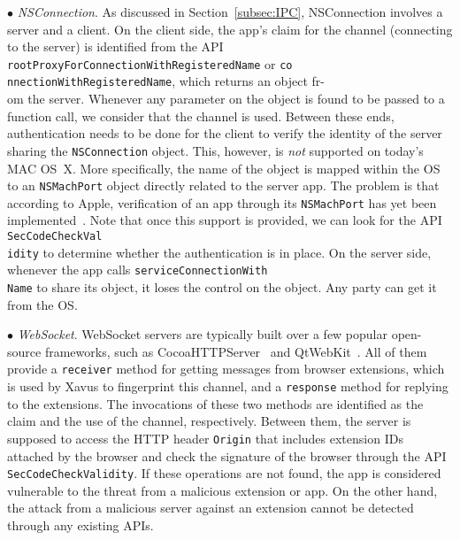 \documentclass{article}
\begin{document}
\vspace {3pt}\noindent$\bullet$\textit{ NSConnection}. As discussed in Section~\ref{subsec:IPC}, NSConnection involves a server and a client. On the client side, the app's claim for the channel (connecting to the server) is identified from the API \texttt{rootProxyForConnectionWithRegisteredName} or \texttt{co\\nnectionWithRegisteredName}, which returns an object fr-\\om the server. Whenever any parameter on the object is found to be passed to a function call, we consider that the channel is used.  Between these ends, authentication needs to be done for the client to verify the identity of the server sharing the \texttt{NSConnection} object.  This, however, is \textit{not} supported on today's MAC OS~X. More specifically, the name of the object is mapped within the OS to an \texttt{NSMachPort} object directly related to the server app.  The problem is that according to Apple, verification of an app through its \texttt{NSMachPort} has yet been implemented~\cite{machnotimp}. Note that once this support is provided, we can look for the API \texttt{SecCodeCheckVal\\idity} to determine whether the authentication is in place. On the server side, whenever the app calls \texttt{serviceConnectionWith\\Name} to share its object, it loses the control on the object. Any party can get it from the OS.



\vspace {3pt}\noindent$\bullet$\textit{ WebSocket}. WebSocket servers are typically built over a few popular open-source frameworks, such as CocoaHTTPServer~\cite{CocoaHTTPServer} and QtWebKit~\cite{QtWebKit}. All of them provide a \texttt{receiver} method for getting messages from browser extensions, which is used by Xavus to fingerprint this channel, and a \texttt{response} method for replying to the extensions. The invocations of these two methods are identified as the claim and the use of the channel, respectively. Between them, the server is supposed to access the HTTP header \texttt{Origin} that includes extension IDs attached by the browser and check the signature of the browser through the API \texttt{SecCodeCheckValidity}. If these operations are not found, the app is considered vulnerable to the threat from a malicious extension or app.  On the other hand, the attack from a malicious server against an extension cannot be detected through any existing APIs.
\end{document}
